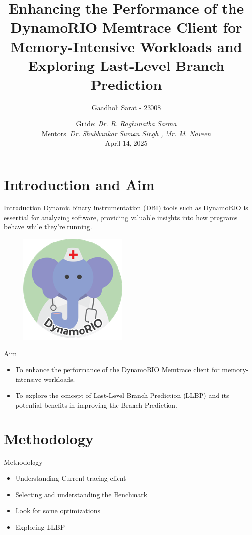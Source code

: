 \documentclass[aspectratio=169]{beamer}
\title{Enhancing the Performance of the DynamoRIO Memtrace Client for Memory-Intensive Workloads and Exploring Last-Level Branch Prediction}
\author{\Large Gandholi Sarat - 23008}
\date{\underline{Guide:} \textit{Dr. R. Raghunatha Sarma}
\\[0.5em] \underline{Mentors:} \textit{Dr. Shubhankar Suman Singh , Mr. M. Naveen} 
\\[0.5em] April 14, 2025}
\begin{document}
\begin{frame}
    \titlepage
\end{frame}

\section{Introduction and Aim}
\begin{frame}{Introduction}
    Dynamic binary instrumentation (DBI) tools such as DynamoRIO is essential for analyzing software, providing valuable insights into how programs behave while they're running. 
    \begin{figure}
        \centering
        \includegraphics[width=0.2\linewidth]{dynamorio.png}
    \end{figure}
    
\end{frame}
\begin{frame}{Aim}
    \begin{itemize}
        \item To enhance the performance of the DynamoRIO Memtrace client for memory-intensive workloads.
        \item To explore the concept of Last-Level Branch Prediction (LLBP) and its potential benefits in improving the Branch Prediction.
    \end{itemize}
\end{frame}

\section{Methodology}
\begin{frame}{Methodology}
    \begin{itemize}
        \item Understanding Current tracing client
        \item Selecting and understanding the Benchmark
        \item Look for some optimizations
        \item Exploring LLBP
    \end{itemize}
\end{frame}
\end{document}
